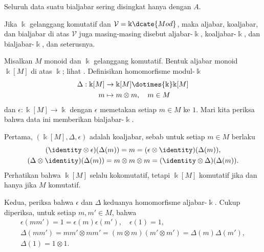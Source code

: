 Seluruh data suatu bialjabar sering disingkat hanya dengan $A$.

Jika $\Bbbk$ gelanggang komutatif dan
$\mathcal{V}=\Bbbk\dcate{Mod}$, maka aljabar, koaljabar, dan bialjabar di atas
$\mathcal{V}$ juga masing-masing disebut aljabar-$\Bbbk$,
koaljabar-$\Bbbk$, dan bialjabar-$\Bbbk$, dan seterusnya.

\begin{example}\label{eg:monoid-bialgebra}
	Misalkan $M$ monoid dan $\Bbbk$ gelanggang komutatif. Bentuk aljabar monoid
	$\Bbbk[M]$ di atas $\Bbbk$; lihat \cite[Definisi 5.6.1]{Li1}. Definisikan
	homomorfisme modul-$\Bbbk$
	\begin{align*}
		\Delta: \Bbbk[M] & \to \Bbbk[M] \dotimes{\Bbbk} \Bbbk[M] \\
		m & \mapsto m \otimes m, \quad m \in M
	\end{align*}
	dan $\epsilon:\Bbbk[M]\to\Bbbk$ dengan $\epsilon$ memetakan setiap
	$m\in M$ ke $1$. Mari kita periksa bahwa data ini memberikan
	bialjabar-$\Bbbk$.

	Pertama, $(\Bbbk[M],\Delta,\epsilon)$ adalah koaljabar, sebab untuk setiap
	$m\in M$ berlaku
	\begin{gather*}
		(\identity \otimes \epsilon)(\Delta(m)) = m = (\epsilon \otimes \identity)(\Delta(m)), \\
		(\Delta \otimes \identity)(\Delta(m)) = m \otimes m \otimes m = (\identity \otimes \Delta)(\Delta(m)).
	\end{gather*}
	Perhatikan bahwa $\Bbbk[M]$ selalu kokomutatif, tetapi $\Bbbk[M]$
	komutatif jika dan hanya jika $M$ komutatif.

	Kedua, periksa bahwa $\epsilon$ dan $\Delta$ keduanya homomorfisme
	aljabar-$\Bbbk$. Cukup diperiksa, untuk setiap
	$m,m'\in M$, bahwa
	\begin{gather*}
		\epsilon(mm') = 1 = \epsilon(m)\epsilon(m'), \quad \epsilon(1) = 1, \\
		\Delta(mm') = mm' \otimes mm' = (m \otimes m)(m' \otimes m') = \Delta(m) \Delta(m'), \\
		\Delta(1) = 1 \otimes 1.
	\end{gather*}
\end{example}


